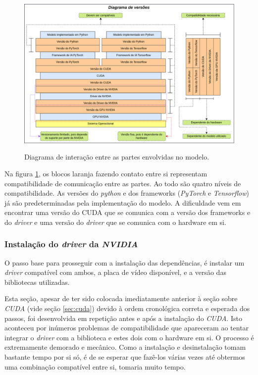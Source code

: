 \begin{figure}[H]
    \centering
    \caption{Diagrama de interação entre as partes envolvidas no modelo.}
    \includegraphics[width=14cm]{fig/version_diagram.png}
    \label{fig:fig24}
\end{figure}

Na figura \ref{fig:fig24}, os blocos laranja fazendo contato entre si representam compatibilidade de comunicação entre as partes. Ao todo são quatro níveis de compatibilidade. As versões do \textit{python} e dos frameworks (\textit{PyTorch} e \textit{Tensorflow}) já são predeterminadas pela implementação do modelo. A dificuldade vem em encontrar uma versão do CUDA que se comunica com a versão dos frameworks e do \textit{driver} e uma versão do \textit{driver} que se comunica com o hardware em si.

\subsubsection{Instalação do \textit{driver} da \textit{NVIDIA}}
\label{sec:driver}

O passo base para prosseguir com a instalação das dependências, é instalar um \textit{driver} compatível com ambos, a placa de vídeo disponível, e a versão das bibliotecas utilizadas.

Esta seção, apesar de ter sido colocada imediatamente anterior à seção sobre \textit{CUDA} (vide seção \ref{sec:cuda}) devido à ordem cronológica correta e esperada dos passos, foi desenvolvida em repetição antes e após a instalação do \textit{CUDA}. Isto aconteceu por inúmeros problemas de compatibilidade que apareceram ao tentar integrar o \textit{driver} com a biblioteca e estes dois com o hardware em si. O processo é extremamente demorado e mecânico. Como a instalação e desinstalação tomam bastante tempo por si só, é de se esperar que fazê-los várias vezes até obtermos uma combinação compatível entre si, tomaria muito tempo.

